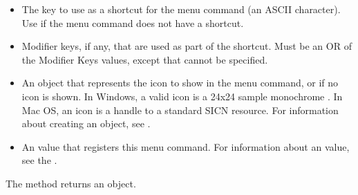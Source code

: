 \documentclass[letterpaper,12pt,english,openany,oneside]{sphinxmanual}
\begin{document}
\begin{enumerate}
\begin{itemize}
\item {} 
The key to use as a shortcut for the menu command (an ASCII character). Use  if the menu command does not have a shortcut.

\item {} 
Modifier keys, if any, that are used as part of the shortcut. Must be an OR of the Modifier Keys values, except that  cannot be specified.

\item {} 
An  object that represents the icon to show in the menu command, or  if no icon is shown. In Windows, a valid icon is a 24x24 sample monochrome . In Mac OS, an icon is a handle to a standard SICN resource. For information about creating an  object, see .

\item {} 
An  value that registers this menu command. For information about an  value, see the .

\end{itemize}

\end{enumerate}

The  method returns an  object.
\end{document}
